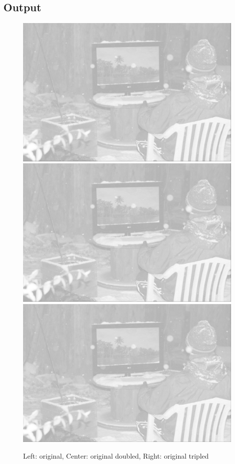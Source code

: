 \documentclass[pdftex,a4paper,10pt,titlepage]{article}
\begin{document}
\subsection{Output}
\begin{figure}[h]
\center
\includegraphics[scale=0.025]{task6a.png} 
\includegraphics[scale=0.05]{task6a.png} 
\includegraphics[scale=0.05]{task6b.png} 
\caption {Left: original, Center: original doubled, Right: original tripled}
\label{fig:copied_image}
\end{figure}
\end{document}
